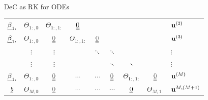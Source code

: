 \documentclass[9pt,compress,t,aspectratio=169]{beamer}
\begin{document}
\begin{frame}{DeC as RK for ODEs}
{\begin{minipage}{0.63\textwidth}
{{\begin{tabular}{|c||ccccccc|l|}
				$\underline{\beta}_{1:}$& $\Theta_{1:,0}$ & $\Theta_{1:,1:}$ & $\underline{\underline{0}}$&&&&&$\mathbf{u}^{(2)}$\\
				$\underline{\beta}_{1:}$& $\Theta_{1:,0}$&  $\underline{\underline{0}}$& $\Theta_{1:,1:}$ & $\underline{\underline{0}}$&&&&$\mathbf{u}^{(3)}$\\
				&$\vdots$   &$\vdots$ &&$\ddots$& $\ddots$&&& $\vdots$\\
				&$\vdots$   &$\vdots$ &&&$\ddots$& $\ddots$&& $\vdots$\\
				$\underline{\beta}_{1:}$ &$\Theta_{1:,0}$ &  $\underline{\underline{0}}$&$\cdots$&$\cdots$&$\underline{\underline{0}}$&$\Theta_{1:,1:}$&$\underline{\underline{0}}$&$\mathbf{u}^{(M)}$\\ \hline\hline
				$\underline{b}$&$\Theta_{M,0}$ &  $\underline{0}$&$\cdots$&$\cdots$&$\cdots$&$\underline{0}$&$\Theta_{M,1:}$&$\mathbf{u}^{M,(M+1)}$\\ \hline
			\end{tabular}}
	}
	\end{minipage}}
	
	\end{frame}
\end{document}
